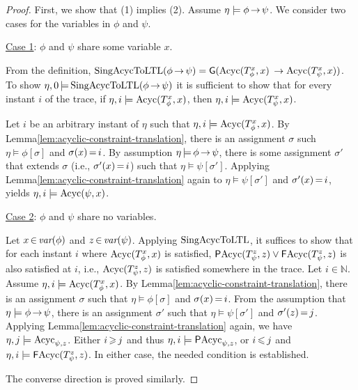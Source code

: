 \begin{proof}
First, we show that (1) implies (2).
Assume $\eta\models\phi\,{\rightarrow}\,\psi$.
We consider two cases for the variables in $\phi$ and $\psi$.

\underline{Case 1}:
$\phi$ and $\psi$ share some variable $x$.

From the definition,
$\text{SingAcycToLTL}(\phi\,{\rightarrow}\,\psi)=
{\sf G}(\text{Acyc}(T_\phi^x,x)$
$\rightarrow\text{Acyc}(T_\psi^x,x))$.
To show
$\eta,0\,{\models}\, \text{SingAcycToLTL}(\phi\,{\rightarrow}\,\psi)$
it is sufficient to show that for every instant $i$ of the trace,
if $\eta,i\models\text{Acyc}(T_\phi^x,x)$,
then $\eta, i\models\text{Acyc}(T_\psi^x,x)$.

Let $i$ be an arbitrary instant of $\eta$ such that
$\eta, i\models\text{Acyc}(T_\phi^x,x)$.
By Lemma\:\ref{lem:acyclic-constraint-translation},
there is an assignment $\sigma$ such $\eta\models\phi[\sigma]$
and $\sigma(x)\,{=}\,i$.
By assumption $\eta\,{\models}\,\phi\,{\rightarrow}\,\psi$,
there is some assignment $\sigma'$ that
extends $\sigma$ (i.e., $\sigma'(x)\,{=}\,i$)
such that $\eta\models\psi[\sigma']$.
Applying Lemma\:\ref{lem:acyclic-constraint-translation} again
to $\eta\models\psi[\sigma']$ and $\sigma'(x)\,{=}\,i$,
yields $\eta, i \models \text{Acyc}(\psi,x)$.

\underline{Case 2}:
$\phi$ and $\psi$ share no variables.

Let 
$x\,{\in}\,\textit{var}(\phi)$ and $z\,{\in}\,\textit{var}(\psi)$.
Applying $\text{SingAcycToLTL}$,
it suffices to show that
for each instant $i$ where $\text{Acyc}(T_\phi^x,x)$ is satisfied,
$\textsf{P}\text{Acyc}(T_\psi^z,z) \lor \textsf{F} \text{Acyc}(T_\psi^z,z)$
is also satisfied at $i$,
i.e., $\text{Acyc}(T_\psi^z,z)$ is satisfied somewhere in the trace.
Let $i\in \mathbb{N}$.
Assume $\eta,i\models\text{Acyc}(T_\phi^x,x)$.
By Lemma\:\ref{lem:acyclic-constraint-translation}, 
there is an assignment $\sigma$ such that
$\eta\models\phi[\sigma]$ and $\sigma(x)\,{=}\,i$.
From the assumption that $\eta\models\phi\,{\rightarrow}\,\psi$,
there is an assignment $\sigma'$
such that $\eta\models\psi[\sigma']$ and $\sigma'(z)\,{=}\,j$.
Applying Lemma\:\ref{lem:acyclic-constraint-translation} again,
we have $\eta,j \models \text{Acyc}_{\psi,z}$.
Either $i \,{\geqslant}\, j$ and
thus $\eta, i\models \textsf{P}\text{Acyc}_{\psi,z}$,
or $i \,{\leqslant}\, j$ and
$\eta, i\models \textsf{F}\text{Acyc}(T_\psi^z,z)$.
In either case, the needed condition is established.

The converse direction is proved similarly.


\end{proof}

